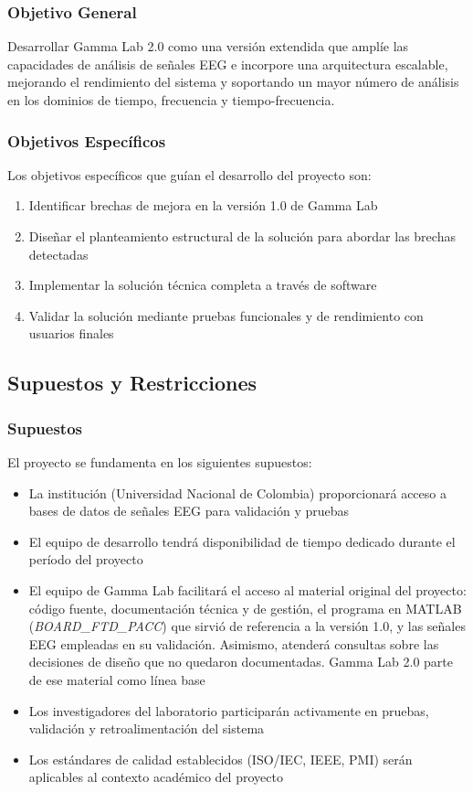 \documentclass{article}
\begin{document}
\subsubsection{Objetivo General}
 
Desarrollar Gamma Lab 2.0 como una versión extendida que amplíe las capacidades de análisis de señales EEG e incorpore una arquitectura escalable, mejorando el rendimiento del sistema y soportando un mayor número de análisis en los dominios de tiempo, frecuencia y tiempo-frecuencia.
 
\subsubsection{Objetivos Específicos}
 
Los objetivos específicos que guían el desarrollo del proyecto son:
 
\begin{enumerate}
    \item Identificar brechas de mejora en la versión 1.0 de Gamma Lab
    \item Diseñar el planteamiento estructural de la solución para abordar las brechas detectadas
    \item Implementar la solución técnica completa a través de software
    \item Validar la solución mediante pruebas funcionales y de rendimiento con usuarios finales
\end{enumerate}
 
\subsection{Supuestos y Restricciones}
 
\subsubsection{Supuestos}
 
El proyecto se fundamenta en los siguientes supuestos:
 
\begin{itemize}
    \item La institución (Universidad Nacional de Colombia) proporcionará acceso a bases de datos de señales EEG para validación y pruebas
    \item El equipo de desarrollo tendrá disponibilidad de tiempo dedicado durante el período del proyecto
    \item El equipo de Gamma Lab facilitará el acceso al material original del proyecto: código fuente, documentación técnica y de gestión, el programa en MATLAB (\textit{BOARD\_FTD\_PACC}) que sirvió de referencia a la versión 1.0, y las señales EEG empleadas en su validación. Asimismo, atenderá consultas sobre las decisiones de diseño que no quedaron documentadas. Gamma Lab 2.0 parte de ese material como línea base
    \item Los investigadores del laboratorio participarán activamente en pruebas, validación y retroalimentación del sistema
    \item Los estándares de calidad establecidos (ISO/IEC, IEEE, PMI) serán aplicables al contexto académico del proyecto
\end{itemize}
 
\end{document}
